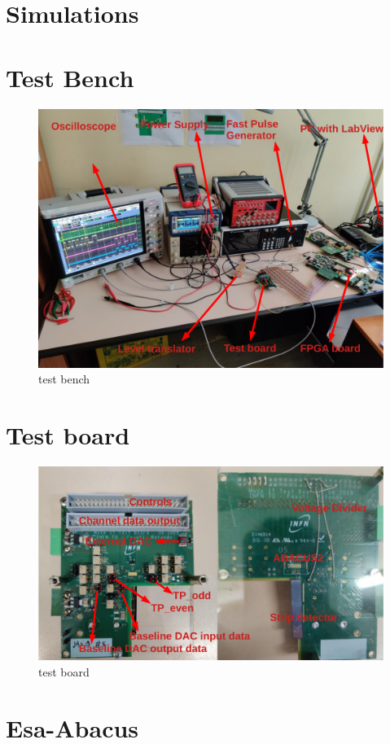 \section{Simulations}

\section{Test Bench}
\begin{figure}[H]
	\centering
	\includegraphics[width=0.7\linewidth]{IMG/ch4/TESTBENCH}
	\caption{test bench}
	\label{fig:testbench}
\end{figure}

\section{Test board}
\begin{figure}[H]
	\centering
	\includegraphics[width=0.7\linewidth]{IMG/ch4/TESTBOARD}
	\caption{test board}
	\label{fig:testboard}
\end{figure}

\section{Esa-Abacus}
